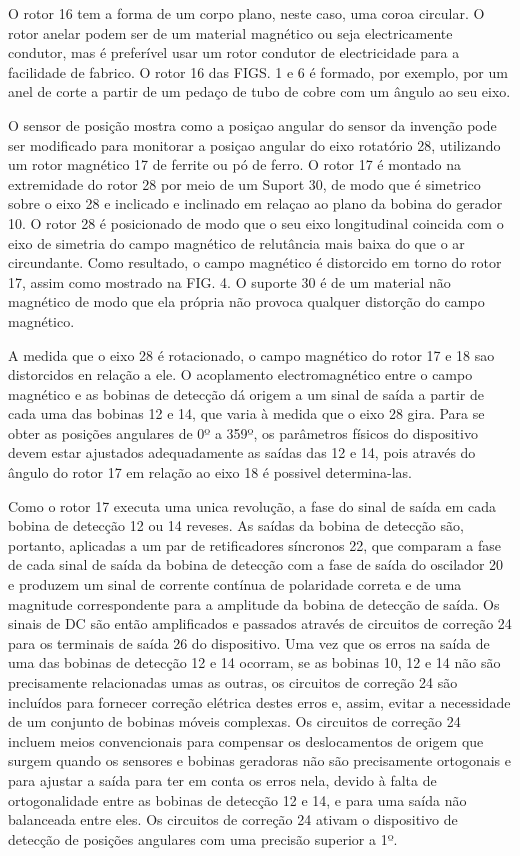 \begin{enumerate}
  O rotor 16 tem a forma de um corpo plano, neste caso, uma coroa circular. O rotor anelar podem ser de um material magnético ou seja electricamente condutor, mas é preferível usar um rotor condutor de electricidade para a facilidade de fabrico. O rotor 16 das FIGS. 1 e 6 é formado, por exemplo, por um anel de corte a partir de um pedaço de tubo de cobre com um ângulo ao seu eixo.

  O sensor de posição mostra como a posiçao angular do sensor da invenção pode ser modificado para monitorar a posiçao angular do eixo rotatório 28, utilizando um rotor magnético 17 de ferrite ou pó de ferro. O rotor 17 é montado na extremidade do rotor 28 por meio de um Suport 30, de modo que é simetrico sobre o eixo 28 e inclicado e inclinado em relaçao ao plano da bobina do gerador 10. O rotor 28 é posicionado de modo que o seu eixo longitudinal coincida com o eixo de simetria do campo magnético de relutância mais baixa do que o ar circundante. Como resultado, o campo magnético é distorcido em torno do rotor 17, assim como mostrado na FIG. 4. O suporte 30 é de um material não magnético de modo que ela própria não provoca qualquer distorção do campo magnético.

  A medida que o eixo 28 é rotacionado, o campo magnético do rotor 17 e 18 sao distorcidos en relação a ele. O acoplamento electromagnético entre o campo magnético e as bobinas de detecção dá origem a um sinal de saída a partir de cada uma das bobinas 12 e 14, que varia à medida que o eixo 28 gira. Para se obter as posições angulares de 0º a 359º, os parâmetros físicos do dispositivo devem estar ajustados adequadamente as saídas das 12 e 14, pois através do ângulo do rotor 17 em relação ao eixo 18 é possivel determina-las.

  Como o rotor 17 executa uma unica revolução, a fase do sinal de saída em cada bobina de detecção 12 ou 14 reveses. As saídas da bobina de detecção são, portanto, aplicadas a um par de retificadores síncronos 22, que comparam a fase de cada sinal de saída da bobina de detecção com a fase de saída do oscilador 20 e produzem um sinal de corrente contínua de polaridade correta e de uma magnitude correspondente para a amplitude da bobina de detecção de saída. Os sinais de DC são então amplificados e passados através de circuitos de correção 24 para os terminais de saída 26 do dispositivo. Uma vez que os erros na saída de uma das bobinas de detecção 12 e 14 ocorram, se as bobinas 10, 12 e 14 não são precisamente relacionadas umas as outras, os circuitos de correção 24 são incluídos para fornecer correção elétrica destes erros e, assim, evitar a necessidade de um conjunto de bobinas móveis complexas. Os circuitos de correção 24 incluem meios convencionais para compensar os deslocamentos de origem que surgem quando os sensores e bobinas geradoras não são precisamente ortogonais e para ajustar a saída para ter em conta os erros nela, devido à falta de ortogonalidade entre as bobinas de detecção 12 e 14, e para uma saída não balanceada entre eles. Os circuitos de correção 24 ativam o dispositivo de detecção de posições angulares com uma precisão superior a 1º.


\end{enumerate}

